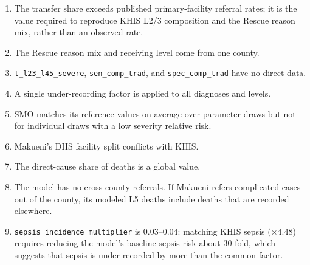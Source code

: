 \documentclass[11pt]{article}
\newcommand{\p}[1]{\texttt{#1}}
\begin{document}
\begin{enumerate}
\item The transfer share exceeds published primary-facility referral rates; it
is the value required to reproduce KHIS L2/3 composition and the Rescue reason
mix, rather than an observed rate.
\item The Rescue reason mix and receiving level come from one county.
\item \p{t\_l23\_l45\_severe}, \p{sen\_comp\_trad}, and \p{spec\_comp\_trad} have
no direct data.
\item A single under-recording factor is applied to all diagnoses and levels.
\item SMO matches its reference values on average over parameter draws but not
for individual draws with a low severity relative risk.
\item Makueni's DHS facility split conflicts with KHIS.
\item The direct-cause share of deaths is a global value.
\item The model has no cross-county referrals. If Makueni refers complicated
cases out of the county, its modeled L5 deaths include deaths that are recorded
elsewhere.
\item \p{sepsis\_incidence\_multiplier} is 0.03--0.04: matching KHIS sepsis
($\times 4.48$) requires reducing the model's baseline sepsis risk about 30-fold,
which suggests that sepsis is under-recorded by more than the common factor.
\end{enumerate}
\end{document}

